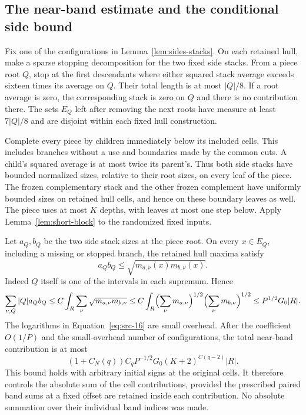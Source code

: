 \subsection{The near-band estimate and the conditional side bound}

Fix one of the configurations in Lemma~\ref{lem:sides-stacks}.
On each retained hull, make a sparse stopping decomposition for the
two fixed side stacks.  From a piece root $Q$, stop at the first
descendants where either squared stack average exceeds sixteen
times its average on $Q$.  Their total length is at most
$|Q|/8$.  If a root average is zero, the corresponding stack is
zero on $Q$ and there is no contribution there.  The sets $E_Q$
left after removing the next roots have measure at least
$7|Q|/8$ and are disjoint within each fixed hull construction.

Complete every piece by children immediately below its included
cells.  This includes branches without a use and boundaries made
by the common cuts.  A child's squared average is at most twice
its parent's.  Thus both side stacks have bounded normalized
sizes, relative to their root sizes, on every leaf of the piece.
The frozen complementary stack and the other frozen complement
have uniformly bounded sizes on retained hull cells, and hence
on these boundary leaves as well.  The piece uses at most $K$
depths, with leaves at most one step below.  Apply
Lemma~\ref{lem:short-block} to the randomized fixed inputs.

Let $a_Q,b_Q$ be the two side stack sizes at the piece root.  On
every $x\in E_Q$, including a missing or stopped branch, the
retained hull maxima satisfy
\[
 a_Qb_Q\le\sqrt{m_{a,\nu}(x)m_{b,\nu}(x)}.
\]
Indeed $Q$ itself is one of the intervals in each supremum.  Hence
\[
 \sum_{\nu,Q}|Q|a_Qb_Q
 \le C\int_R\sum_\nu
              \sqrt{m_{a,\nu}m_{b,\nu}}
 \le C\int_R
       \Bigl(\sum_\nu m_{a,\nu}\Bigr)^{1/2}
       \Bigl(\sum_\nu m_{b,\nu}\Bigr)^{1/2}
 \le P^{1/2}G_0|R|.
\]
The logarithms in Equation~\eqref{eq:src-16} are small overhead.
After the coefficient $O(1/P)$ and the small-overhead number of
configurations, the total near-band contribution is at most
\[
 (1+C_N(q))C_qP^{-1/2}G_0(K+2)^{C(q-2)}|R|.
 \tag{19}\label{eq:src-19}
\]
This bound holds with arbitrary initial signs at the original cells.
It therefore controls the absolute sum of the cell contributions,
provided the prescribed paired band sums at a fixed offset are
retained inside each contribution.  No absolute summation over
their individual band indices was made.

